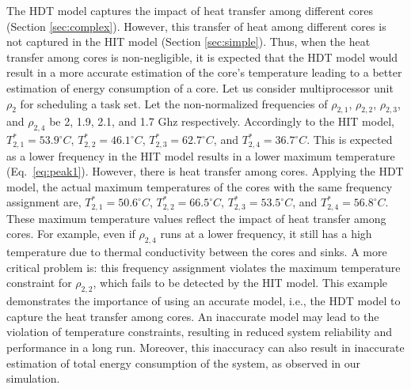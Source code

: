 \documentclass[conference]{IEEEtran}
\begin{document}
The HDT model captures the impact of heat transfer among different cores (Section \ref{sec:complex}).
However, this transfer of heat among different cores is not captured in the HIT model (Section \ref{sec:simple}).
Thus, when the heat transfer among cores is non-negligible, it is expected that the HDT model would result in a more accurate estimation of the core's temperature
leading to a better estimation of
energy consumption of a core. Let us consider multiprocessor unit $\rho_2$ for scheduling a task set. Let the non-normalized frequencies of $\rho_{2,1}$, $\rho_{2,2}$,
$\rho_{2,3}$, and $\rho_{2,4}$ be 2, 1.9, 2.1, and 1.7 Ghz respectively. Accordingly to the HIT model, $T^*_{2,1}=53.9^\circ C$,  $T^*_{2,2}=46.1^\circ C$,
$T^*_{2,3}=62.7^\circ C$, and  $T^*_{2,4}=36.7^\circ C$. This is expected as a lower frequency in the HIT model results in a lower maximum temperature (Eq.~\ref{eq:peak1}).
%
%
However, there is heat transfer among cores. Applying the HDT model, the actual maximum temperatures of the cores with the same frequency assignment are,
$T^*_{2,1}=50.6^\circ C$,  $T^*_{2,2}=66.5^\circ C$, $T^*_{2,3}=53.5^\circ C$, and  $T^*_{2,4}=56.8^\circ C$.
These maximum temperature values reflect the impact of heat transfer among cores. For example, even if $\rho_{2,4}$ runs at a lower frequency,
it still has a high temperature due to thermal conductivity between the cores and sinks. A more critical problem is: this frequency assignment violates the
maximum temperature constraint for $\rho_{2,2}$, which fails to be detected by the HIT model.
%
%
This example demonstrates the importance of using an accurate model, i.e., the HDT model to capture the heat transfer among cores. An inaccurate model may lead to the violation of temperature constraints, resulting in reduced system reliability and performance in a long run.
Moreover, this inaccuracy can also result in inaccurate estimation of total energy consumption of the system, as observed in our simulation.


\end{document}
